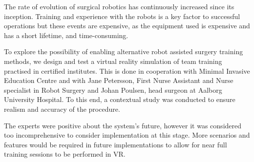 The rate of evolution of surgical robotics has continuously increased since its inception. Training and experience with the robots is a key factor to successful operations but these events are expensive, as the equipment used is expensive and has a short lifetime, and time-consuming.

To explore the possibility of enabling alternative robot assisted surgery training methods, we design and test a virtual reality simulation of team training practised in certified institutes. This is done in cooperation with Minimal Invasive Education Centre and with Jane Petersson, First Nurse Assistant and Nurse specialist in Robot Surgery and Johan Poulsen, head surgeon at Aalborg University Hospital. To this end, a contextual study was conducted to ensure realism and accuracy of the procedure.

The experts were positive about the system's future, however it was considered too incomprehensive to consider implementation at this stage. More scenarios and features would be required in future implementations to allow for near full training sessions to be performed in VR.